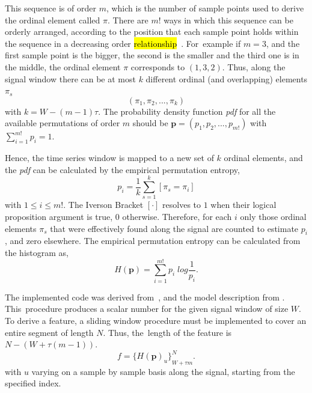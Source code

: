 \documentclass[brainsci,article,accept,moreauthors,pdftex,10pt,a4paper]{mdpi}
\begin{document}
This sequence is of order $m$, which is the number of sample points used to derive the ordinal element called $\pi$. There are $m!$ ways in which this sequence can be orderly arranged, according to the position that each sample point holds within the sequence in a decreasing order \hl{relationship}~\citep{Keller2017}.  For~example if $m=3$, and the first sample point is the bigger, the second is the smaller and the third one is in the middle, the ordinal element $\pi$ corresponds to $(1,3,2)$. Thus, along the signal window there can be at most $k$ different ordinal (and overlapping) elements $\pi_{s}$%
\begin{equation}
(\pi_{1},\pi_{2},...,\pi_{k})
\label{eq:pe3}
\end{equation}
with $k = W-(m-1) \tau$.  The probability density function \textit{pdf} for all the available permutations of order $m$ should be $ \textbf{p} = (p_1,p_2,...,p_{m!}) $ with $ \sum_{i=1}^{m!} p_{i} = 1 $.

Hence, the time series window is mapped to a new set of $k$ ordinal elements, and the \textit{pdf} can be calculated by the empirical permutation entropy,
\begin{equation}
p_i = \frac{1}{k} \sum_{s=1}^{k} \left[ \pi_{s} = \pi_{i} \right]
\label{eq:pe4}
\end{equation}
with $1 \leq i \leq m!$. The Iverson Bracket $ \left[ \cdot \right] $ resolves to $1$ when their logical proposition argument is true, $0$ otherwise. Therefore, for each $i$ only those ordinal elements $\pi_{s}$ that were effectively found along the signal are counted to estimate $p_i$, and zero elsewhere.  The empirical permutation entropy can be calculated from the histogram as,
\begin{equation}
H(\textbf{p}) = \sum_{i=1}^{m!} p_{i} \; log \frac{1}{p_{i}}.
\label{eq:pe5}
\end{equation}

The implemented code was derived from~\citep{Unakafova2013}, and the model description from \citep{Berger2017}.  This~procedure produces a scalar number for the given signal window of size $W$.  To derive a feature, a sliding window procedure must be implemented to cover an entire segment of length $N$.  Thus, the~length of the feature is $N - (W + \tau (m - 1))$.
\begin{equation}
f =  {\bigg \{ H(\textbf{p})_{u} \bigg \}}_{W + \tau  m}^{N}.
\label{eq:pe6}
\end{equation}
with $u$ varying on a sample by sample basis along the signal, starting from the specified index.
\end{document}
